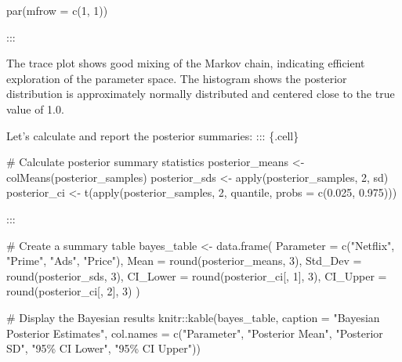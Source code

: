 \documentclass[
  letterpaper,
  DIV=11,
  numbers=noendperiod]{scrartcl}
\newenvironment{Shaded}{\begin{snugshade}}{\end{snugshade}}
\newcommand{\AttributeTok}[1]{\textcolor[rgb]{0.40,0.45,0.13}{#1}}
\newcommand{\CommentTok}[1]{\textcolor[rgb]{0.37,0.37,0.37}{#1}}
\newcommand{\DecValTok}[1]{\textcolor[rgb]{0.68,0.00,0.00}{#1}}
\newcommand{\FloatTok}[1]{\textcolor[rgb]{0.68,0.00,0.00}{#1}}
\newcommand{\FunctionTok}[1]{\textcolor[rgb]{0.28,0.35,0.67}{#1}}
\newcommand{\NormalTok}[1]{\textcolor[rgb]{0.00,0.23,0.31}{#1}}
\newcommand{\OtherTok}[1]{\textcolor[rgb]{0.00,0.23,0.31}{#1}}
\newcommand{\SpecialCharTok}[1]{\textcolor[rgb]{0.37,0.37,0.37}{#1}}
\newcommand{\StringTok}[1]{\textcolor[rgb]{0.13,0.47,0.30}{#1}}
\begin{document}
\begin{Shaded}
\begin{Highlighting}[]
\FunctionTok{par}\NormalTok{(}\AttributeTok{mfrow =} \FunctionTok{c}\NormalTok{(}\DecValTok{1}\NormalTok{, }\DecValTok{1}\NormalTok{))}
\end{Highlighting}
\end{Shaded}

:::

The trace plot shows good mixing of the Markov chain, indicating
efficient exploration of the parameter space. The histogram shows the
posterior distribution is approximately normally distributed and
centered close to the true value of 1.0.

Let's calculate and report the posterior summaries: ::: \{.cell\}

\begin{Shaded}
\begin{Highlighting}[]
\CommentTok{\# Calculate posterior summary statistics}
\NormalTok{posterior\_means }\OtherTok{\textless{}{-}} \FunctionTok{colMeans}\NormalTok{(posterior\_samples)}
\NormalTok{posterior\_sds }\OtherTok{\textless{}{-}} \FunctionTok{apply}\NormalTok{(posterior\_samples, }\DecValTok{2}\NormalTok{, sd)}
\NormalTok{posterior\_ci }\OtherTok{\textless{}{-}} \FunctionTok{t}\NormalTok{(}\FunctionTok{apply}\NormalTok{(posterior\_samples, }\DecValTok{2}\NormalTok{, quantile, }\AttributeTok{probs =} \FunctionTok{c}\NormalTok{(}\FloatTok{0.025}\NormalTok{, }\FloatTok{0.975}\NormalTok{)))}
\end{Highlighting}
\end{Shaded}

:::

\begin{Shaded}
\begin{Highlighting}[]
\CommentTok{\# Create a summary table}
\NormalTok{bayes\_table }\OtherTok{\textless{}{-}} \FunctionTok{data.frame}\NormalTok{(}
  \AttributeTok{Parameter =} \FunctionTok{c}\NormalTok{(}\StringTok{"Netflix"}\NormalTok{, }\StringTok{"Prime"}\NormalTok{, }\StringTok{"Ads"}\NormalTok{, }\StringTok{"Price"}\NormalTok{),}
  \AttributeTok{Mean =} \FunctionTok{round}\NormalTok{(posterior\_means, }\DecValTok{3}\NormalTok{),}
  \AttributeTok{Std\_Dev =} \FunctionTok{round}\NormalTok{(posterior\_sds, }\DecValTok{3}\NormalTok{),}
  \AttributeTok{CI\_Lower =} \FunctionTok{round}\NormalTok{(posterior\_ci[, }\DecValTok{1}\NormalTok{], }\DecValTok{3}\NormalTok{),}
  \AttributeTok{CI\_Upper =} \FunctionTok{round}\NormalTok{(posterior\_ci[, }\DecValTok{2}\NormalTok{], }\DecValTok{3}\NormalTok{)}
\NormalTok{)}

\CommentTok{\# Display the Bayesian results}
\NormalTok{knitr}\SpecialCharTok{::}\FunctionTok{kable}\NormalTok{(bayes\_table, }
             \AttributeTok{caption =} \StringTok{"Bayesian Posterior Estimates"}\NormalTok{,}
             \AttributeTok{col.names =} \FunctionTok{c}\NormalTok{(}\StringTok{"Parameter"}\NormalTok{, }\StringTok{"Posterior Mean"}\NormalTok{, }\StringTok{"Posterior SD"}\NormalTok{, }
                           \StringTok{"95\% CI Lower"}\NormalTok{, }\StringTok{"95\% CI Upper"}\NormalTok{))}
\end{Highlighting}
\end{Shaded}
\end{document}
